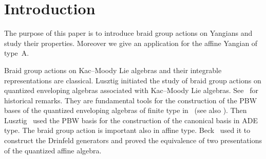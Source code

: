 \documentclass[pdftex]{sigma}
\theoremstyle{definition}
\numberwithin{equation}{section}
\begin{document}
\allowdisplaybreaks

\newcommand{\arXivNumber}{1805.01621}

\renewcommand{\PaperNumber}{020}

\FirstPageHeading










\section{Introduction}

The purpose of this paper is to introduce braid group actions on Yangians and study their properties. Moreover we give an application for the affine Yangian of type~A.

Braid group actions on Kac--Moody Lie algebras and their integrable representations are classical. Lusztig initiated the study of braid group actions on quantized enveloping algebras associated with Kac--Moody Lie algebras. See~\cite[notes on Part~VI]{MR1227098} for historical remarks. They are fundamental tools for the construction of the PBW bases of the quantized enveloping algebras of finite type in~\cite{MR1013053, MR1066560} (see also \cite{MR1081014,MR1120927,MR1265471}). Then Lusztig~\cite{MR1035415} used the PBW basis for the construction of the canonical basis in ADE type. The braid group action is important also in affine type. Beck~\cite{MR1301623} used it to construct the Drinfeld generators and proved the equivalence of two presentations of the quantized affine algebra.
\end{document}
